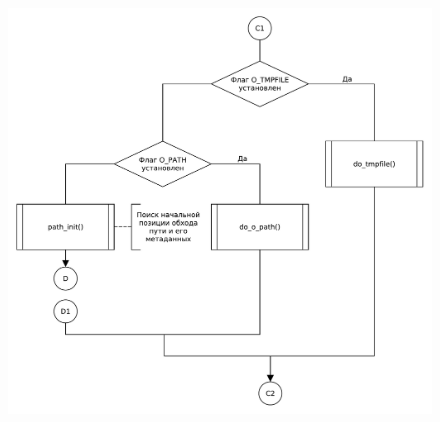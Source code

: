 \begin{figure}[H]
    \centering
    \caption{}
    \includegraphics[scale=0.5]{pdf/flowchart04_1.pdf}
\end{figure}
